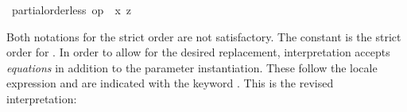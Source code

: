 \begin{isabellebody}
\begin{isamarkuptext}
\begin{isabelle}
\isaindent{\ \ }{\isasymLongrightarrow}\ partial{\isacharunderscore}order{\isachardot}less\ op\ {\isasymle}\ {\isacharquery}x\ {\isacharquery}z%
\end{isabelle}
  Both notations for the strict order are not satisfactory.  The
  constant  is the strict order for .
  In order to allow for the desired replacement, interpretation
  accepts \emph{equations} in addition to the parameter instantiation.
  These follow the locale expression and are indicated with the
  keyword .  This is the revised interpretation:%
\end{isamarkuptext}%
\isamarkuptrue%
%
\isadelimtheory
%
\endisadelimtheory
%
\isatagtheory
{}\isamarkupfalse%
%
\endisatagtheory
{\isafoldtheory}%
%
\isadelimtheory
%
\endisadelimtheory
\isanewline
\end{isabellebody}%

